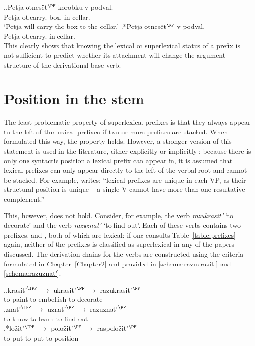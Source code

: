 \ex.\label{ex:otnesti}\ag.Petja otnes\"{e}t$^{\PF}$ korobku v podval.\\
Petja ot.carry. box. in cellar.\\
\trans `Petja will carry the box to the cellar.'
\bg.*Petja otnes\"{e}t$^{\PF}$ v podval.\\
Petja ot.carry. in cellar.\\

This clearly shows that knowing the lexical or superlexical status of a prefix is not sufficient to predict whether its attachment will change the argument structure of the derivational base verb.
\section{Position in the stem}\label{section:new:position}
The least problematic property of superlexical prefixes is that they always appear to the left of the lexical prefixes if two or more prefixes are stacked. When formulated this way, the property holds. However, a stronger version of this statement is used in the literature, either explicitly \citep{Svenonius:04b} or implicitly \citep{Tatevosov:09}: because there is only one syntactic position a lexical prefix can appear in, it is assumed that lexical prefixes can only appear directly to the left of the verbal root and cannot be stacked. For example, \citet[206]{Svenonius:04b} writes: ``lexical prefixes are unique in each VP, as their structural position is unique -- a single V cannot have more than one resultative complement.''


This, however, does not hold. Consider, for example, the verb \textit{razukrasit'} `to decorate' and the verb \textit{razuznat'} `to find out'. Each of these verbs contains two prefixes,  and , both of which are lexical: if one consults Table~\ref{table:prefixes} again, neither of the prefixes is classified as superlexical in any of the papers discussed. The derivation chains for the verbs are constructed using the criteria formulated in Chapter~\ref{Chapter2} and provided in \ref{schema:razukrasit'} and \ref{schema:razuznat'}.

\ex.\ag.\label{schema:razukrasit'}krasit'$^{\IPF}$ {$\rightarrow$} ukrasit'$^{\PF}$ {$\rightarrow$} razukrasit'$^{\PF}$\\
{to paint} {} {to embellish} {} {to decorate}\\
\bg.\label{schema:razuznat'}znat'$^{\IPF}$ {$\rightarrow$} uznat'$^{\PF}$ {$\rightarrow$} razuznat'$^{\PF}$\\
{to know} {} {to learn} {} {to find out}\\
\bg.*lo\v{z}it'$^{\IPF}$ {$\rightarrow$} polo\v{z}it'$^{\PF}$ {$\rightarrow$} raspolo\v{z}it'$^{\PF}$\label{schema:raspolozit'}\\
{to put} {} {to put} {} {to position}\\

